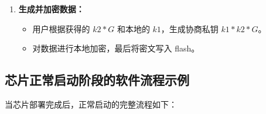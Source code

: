 \documentclass[main\_\_CN.tex]{subfiles}
\begin{document}
\begin{enumerate}
    \item \textbf{生成并加密数据：}
    \begin{itemize}
    \item 用户根据获得的 \hyperref[para:k2G]{\begin{math}k2*G\end{math}} 和本地的 \hyperref[para:k1]{\begin{math}k1\end{math}}，生成协商私钥 \hyperref[para:k1k2G]{\begin{math}k1*k2*G\end{math}}。
    \item 对数据进行本地加密，最后将密文写入 flash。
    \end{itemize}
\end{enumerate}


\subsection{芯片正常启动阶段的软件流程示例}
当芯片部署完成后，正常启动的完整流程如下：
\end{document}
